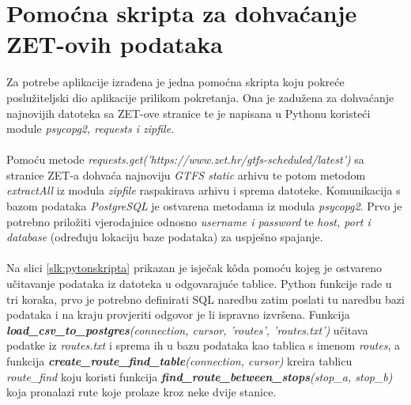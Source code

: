 \documentclass[zavrsnirad]{fer}
\begin{document}
\section{Pomoćna skripta za dohvaćanje ZET-ovih podataka}
\label{sec:skripta}
Za potrebe aplikacije izrađena je jedna pomoćna skripta koju pokreće poslužiteljski dio aplikacije prilikom pokretanja. Ona je zadužena za dohvaćanje najnovijih datoteka sa ZET-ove stranice te je napisana u Pythonu koristeći module \textit{psycopg2, requests i zipfile}.\\\\
Pomoću metode \textit{requests.get('https://www.zet.hr/gtfs-scheduled/latest')} sa stranice ZET-a dohvaća najnoviju \textit{GTFS static} arhivu te potom metodom \textit{extractAll} iz modula \textit{zipfile} raspakirava arhivu i sprema datoteke. Komunikacija s bazom podataka \textit{PostgreSQL} je ostvarena metodama iz modula \textit{psycopg2}. Prvo je potrebno priložiti vjerodajnice odnosno \textit{username i password} te \textit{host, port i database} (određuju lokaciju baze podataka) za uspješno spajanje.\\\\
Na slici \ref{slk:pytonskripta} prikazan je isječak k\^oda pomoću kojeg je ostvareno učitavanje podataka iz datoteka u odgovarajuće tablice. Python funkcije rade u tri koraka, prvo je potrebno definirati SQL naredbu zatim poslati tu naredbu bazi podataka i na kraju provjeriti odgovor je li ispravno izvršena. Funkcija \textit{\textbf{load\_csv\_to\_postgres}(connection, cursor, 'routes', 'routes.txt')} učitava podatke iz \textit{routes.txt}  i sprema ih u bazu podataka kao tablica s imenom \textit{routes}, a funkcija \textit{\textbf{create\_route\_find\_table}(connection, cursor)} kreira tablicu \textit{route\_find} koju koristi funkcija \textit{\textbf{find\_route\_between\_stops}(stop\_a, stop\_b)} koja pronalazi rute koje prolaze kroz neke dvije stanice.
\end{document}
